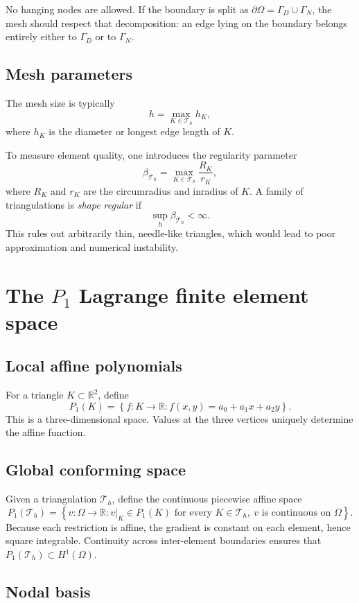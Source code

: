 \documentclass[11pt]{article}
\theoremstyle{definition}
\newcommand{\R}{\mathbb{R}}
\newcommand{\set}[1]{\left\{ #1\right\}}
\begin{document}
No hanging nodes are allowed. If the boundary is split as $\partial\Omega=\Gamma_D\cup\Gamma_N$, the mesh should respect that decomposition: an edge lying on the boundary belongs entirely either to $\Gamma_D$ or to $\Gamma_N$.

\subsection{Mesh parameters}

The mesh size is typically
\[
h = \max_{K\in\mathcal{T}_h} h_K,
\]
where $h_K$ is the diameter or longest edge length of $K$.

To measure element quality, one introduces the regularity parameter
\[
\beta_{\mathcal{T}_h} = \max_{K\in\mathcal{T}_h} \frac{R_K}{r_K},
\]
where $R_K$ and $r_K$ are the circumradius and inradius of $K$. A family of triangulations is \emph{shape regular} if
\[
\sup_h \beta_{\mathcal{T}_h} < \infty.
\]
This rules out arbitrarily thin, needle-like triangles, which would lead to poor approximation and numerical instability.

\section{The $P_1$ Lagrange finite element space}

\subsection{Local affine polynomials}

For a triangle $K\subset\R^2$, define
\[
P_1(K)=\set{f:K\to\R : f(x,y)=a_0+a_1x+a_2y}.
\]
This is a three-dimensional space. Values at the three vertices uniquely determine the affine function.

\subsection{Global conforming space}

Given a triangulation $\mathcal{T}_h$, define the continuous piecewise affine space
\[
P_1(\mathcal{T}_h) = \set{v:\Omega\to\R : v|_K\in P_1(K) \text{ for every } K\in\mathcal{T}_h,\ v \text{ is continuous on } \Omega}.
\]
Because each restriction is affine, the gradient is constant on each element, hence square integrable. Continuity across inter-element boundaries ensures that $P_1(\mathcal{T}_h)\subset H^1(\Omega)$.

\subsection{Nodal basis}
\end{document}
